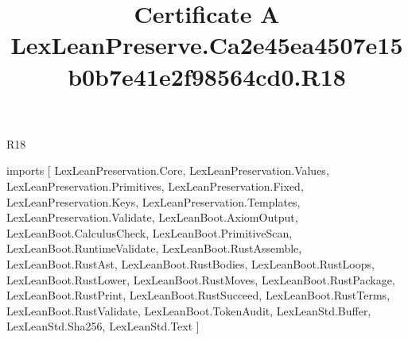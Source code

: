 \begin{lexlean}{R18}
\title{Certificate A LexLeanPreserve.Ca2e45ea4507e15b0b7e41e2f98564cd0.R18}
\begin{coremodule}
imports [
  LexLeanPreservation.Core,
  LexLeanPreservation.Values,
  LexLeanPreservation.Primitives,
  LexLeanPreservation.Fixed,
  LexLeanPreservation.Keys,
  LexLeanPreservation.Templates,
  LexLeanPreservation.Validate,
  LexLeanBoot.AxiomOutput,
  LexLeanBoot.CalculusCheck,
  LexLeanBoot.PrimitiveScan,
  LexLeanBoot.RuntimeValidate,
  LexLeanBoot.RustAssemble,
  LexLeanBoot.RustAst,
  LexLeanBoot.RustBodies,
  LexLeanBoot.RustLoops,
  LexLeanBoot.RustLower,
  LexLeanBoot.RustMoves,
  LexLeanBoot.RustPackage,
  LexLeanBoot.RustPrint,
  LexLeanBoot.RustSucceed,
  LexLeanBoot.RustTerms,
  LexLeanBoot.RustValidate,
  LexLeanBoot.TokenAudit,
  LexLeanStd.Buffer,
  LexLeanStd.Sha256,
  LexLeanStd.Text
]


\end{coremodule}
\end{lexlean}

